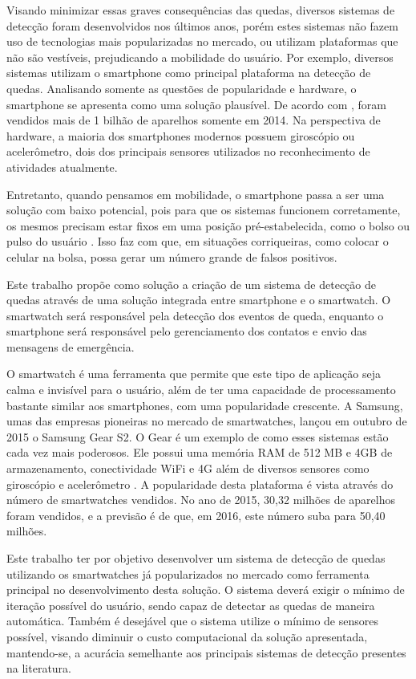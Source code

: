 Visando minimizar essas graves consequências das quedas, diversos sistemas de detecção foram desenvolvidos nos últimos anos, porém estes sistemas não fazem uso de tecnologias mais popularizadas no mercado, ou utilizam plataformas que não são vestíveis, prejudicando a mobilidade do usuário. Por exemplo, diversos sistemas utilizam o smartphone como principal plataforma na detecção de quedas. Analisando somente as questões de popularidade e hardware, o smartphone se apresenta como uma solução plausível. De acordo com \cite{smartphoneSales:15}, foram vendidos mais de 1 bilhão de aparelhos somente em 2014. Na perspectiva de hardware, a maioria dos smartphones modernos possuem giroscópio ou  acelerômetro, dois dos principais sensores utilizados no reconhecimento de atividades atualmente.
 
Entretanto, quando pensamos em mobilidade, o smartphone passa a ser uma solução com baixo potencial,  pois para que os sistemas funcionem corretamente, os mesmos precisam estar fixos em uma posição pré-estabelecida, como o bolso ou pulso do usuário \citep{FallDectionSmartPhone:12}. Isso faz com que, em situações corriqueiras, como colocar o celular na bolsa, possa gerar um número grande de falsos positivos.

Este trabalho propõe como solução a criação de um sistema de detecção de quedas através de uma solução integrada entre smartphone e o smartwatch. O smartwatch será responsável pela detecção dos eventos de queda, enquanto o smartphone será responsável pelo gerenciamento dos contatos e envio das mensagens de emergência. 

O smartwatch é uma ferramenta que permite que este tipo de aplicação seja calma e invisível para o usuário, além de ter uma capacidade de processamento bastante similar aos smartphones, com uma popularidade crescente. A Samsung, umas das empresas pioneiras no mercado de smartwatches, lançou em outubro de 2015 o Samsung Gear S2. O Gear é um exemplo de como esses sistemas estão cada vez mais poderosos. Ele possui uma memória RAM de 512 MB e 4GB de armazenamento,  conectividade WiFi e 4G além de diversos sensores como giroscópio e acelerômetro \cite{samsungSpecification:16}. A popularidade desta plataforma é vista através do número de smartwatches vendidos. No ano de 2015, 30,32 milhões de aparelhos foram vendidos, e a previsão é de que, em 2016, este número suba para 50,40 milhões. 

Este trabalho ter por objetivo desenvolver um sistema de detecção de quedas utilizando os smartwatches já popularizados no mercado como ferramenta principal no desenvolvimento desta solução. O sistema deverá exigir o mínimo de iteração possível do usuário, sendo capaz de detectar as quedas de maneira automática. Também é desejável que o sistema utilize o mínimo de sensores possível, visando diminuir o custo computacional da solução apresentada, mantendo-se, a acurácia semelhante aos principais sistemas de detecção presentes na literatura.

